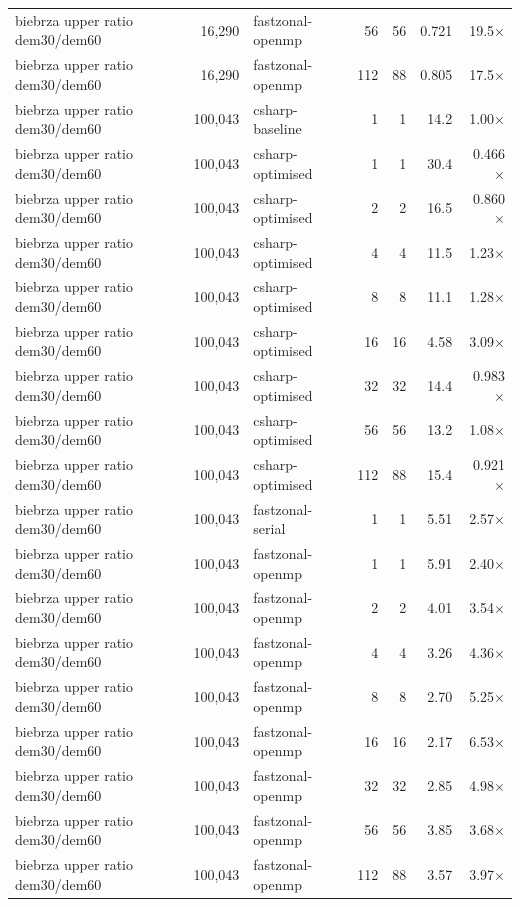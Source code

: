 \begin{tabular}{lrlrrrr}
biebrza upper ratio dem30/dem60 & 16,290 & fastzonal-openmp & 56 & 56 & 0.721 & 19.5$\times$ \\
biebrza upper ratio dem30/dem60 & 16,290 & fastzonal-openmp & 112 & 88 & 0.805 & 17.5$\times$ \\
biebrza upper ratio dem30/dem60 & 100,043 & csharp-baseline & 1 & 1 & 14.2 & 1.00$\times$ \\
biebrza upper ratio dem30/dem60 & 100,043 & csharp-optimised & 1 & 1 & 30.4 & 0.466$\times$ \\
biebrza upper ratio dem30/dem60 & 100,043 & csharp-optimised & 2 & 2 & 16.5 & 0.860$\times$ \\
biebrza upper ratio dem30/dem60 & 100,043 & csharp-optimised & 4 & 4 & 11.5 & 1.23$\times$ \\
biebrza upper ratio dem30/dem60 & 100,043 & csharp-optimised & 8 & 8 & 11.1 & 1.28$\times$ \\
biebrza upper ratio dem30/dem60 & 100,043 & csharp-optimised & 16 & 16 & 4.58 & 3.09$\times$ \\
biebrza upper ratio dem30/dem60 & 100,043 & csharp-optimised & 32 & 32 & 14.4 & 0.983$\times$ \\
biebrza upper ratio dem30/dem60 & 100,043 & csharp-optimised & 56 & 56 & 13.2 & 1.08$\times$ \\
biebrza upper ratio dem30/dem60 & 100,043 & csharp-optimised & 112 & 88 & 15.4 & 0.921$\times$ \\
biebrza upper ratio dem30/dem60 & 100,043 & fastzonal-serial & 1 & 1 & 5.51 & 2.57$\times$ \\
biebrza upper ratio dem30/dem60 & 100,043 & fastzonal-openmp & 1 & 1 & 5.91 & 2.40$\times$ \\
biebrza upper ratio dem30/dem60 & 100,043 & fastzonal-openmp & 2 & 2 & 4.01 & 3.54$\times$ \\
biebrza upper ratio dem30/dem60 & 100,043 & fastzonal-openmp & 4 & 4 & 3.26 & 4.36$\times$ \\
biebrza upper ratio dem30/dem60 & 100,043 & fastzonal-openmp & 8 & 8 & 2.70 & 5.25$\times$ \\
biebrza upper ratio dem30/dem60 & 100,043 & fastzonal-openmp & 16 & 16 & 2.17 & 6.53$\times$ \\
biebrza upper ratio dem30/dem60 & 100,043 & fastzonal-openmp & 32 & 32 & 2.85 & 4.98$\times$ \\
biebrza upper ratio dem30/dem60 & 100,043 & fastzonal-openmp & 56 & 56 & 3.85 & 3.68$\times$ \\
biebrza upper ratio dem30/dem60 & 100,043 & fastzonal-openmp & 112 & 88 & 3.57 & 3.97$\times$ \\

\end{tabular}
